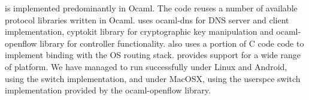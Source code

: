 \signpost is implemented predominantly in Ocaml. The code reuses a number of available
protocol libraries written in Ocaml. \signpost uses ocaml-dns for DNS server and
client implementation, cyptokit library for cryptographic key manipulation and
ocaml-openflow library for \of controller functionality. \signpost also uses a
portion of C code code to implement binding with the OS routing stack. \signpost
provides support for a wide range of platform. We have managed to run \signpost
successfully under Linux and Android,
using the \ovs switch implementation, and under MacOSX, using the userspce
switch implementation provided by the ocaml-openflow library.


